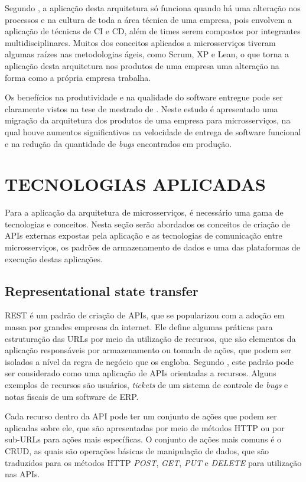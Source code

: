 Segundo , a aplicação desta arquitetura só funciona
quando há uma alteração nos processos e na cultura de toda a área técnica
de uma empresa, pois envolvem a aplicação de técnicas de \ac{CI} e \ac{CD},
além de times serem compostos por integrantes multidisciplinares. Muitos dos
conceitos aplicados a microsserviços tiveram algumas raízes nas metodologias
ágeis, como Scrum, XP e Lean, o que torna a aplicação desta arquitetura nos
produtos de uma empresa uma alteração na forma como a própria empresa trabalha.

Os benefícios na produtividade e na qualidade do software entregue pode
ser claramente vistos na tese de mestrado de . Neste
estudo é apresentado uma migração da arquitetura dos produtos de uma empresa
para microsserviços, na qual houve aumentos significativos na velocidade de
entrega de software funcional e na redução da quantidade de \emph{bugs}
encontrados em produção.

\section{TECNOLOGIAS APLICADAS}

Para a aplicação da arquitetura de microsserviços, é necessário uma gama de
tecnologias e conceitos. Nesta seção serão abordados os conceitos de criação
de APIs externas expostas pela aplicação e as tecnologias de comunicação entre
microsserviços, os padrões de armazenamento de dados e uma das plataformas de
execução destas aplicações.

\subsection{Representational state transfer}

\ac{REST} é um padrão de criação de \acp{API}, que se popularizou com a
adoção em massa por grandes empresas da internet. Ele define algumas práticas
para estruturação das \acp{URL} por meio da utilização de recursos, que são
elementos da aplicação responsáveis por armazenamento ou tomada de ações, que
podem ser isolados a nível da regra de negócio que os engloba. Segundo
, este padrão pode ser considerado como uma aplicação
de \acp{API} orientadas a recursos. Alguns exemplos de recursos são usuários,
\emph{tickets} de um sistema de controle de \emph{bugs} e notas fiscais de um
software de \ac{ERP}.

Cada recurso dentro da \ac{API} pode ter um conjunto de ações que podem ser
aplicadas sobre ele, que são apresentadas por meio de métodos \ac{HTTP} ou
por sub-\acp{URL} para ações mais específicas. O conjunto de ações mais
comuns é o \ac{CRUD}, as quais são operações básicas de manipulação de dados,
que são traduzidos para os métodos \ac{HTTP} \emph{POST}, \emph{GET},
\emph{PUT} e \emph{DELETE} para utilização nas \acp{API}.

